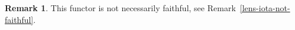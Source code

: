 \documentclass[11pt,a4paper]{article}
\theoremstyle{plain}
\newtheorem{theorem}{Theorem}[subsection]
\theoremstyle{definition}
\newtheorem{remark}[theorem]{Remark}
\newcommand{\C}{\mathscr{C}}
\newcommand{\Optic}{\mathbf{Optic}}
\newcommand{\todo}[1]{\textcolor{red}{\small #1}}
\begin{document}
\begin{remark}
  This functor is not necessarily faithful, see Remark~\ref{lens-iota-not-faithful}.
\end{remark}


\end{document}
